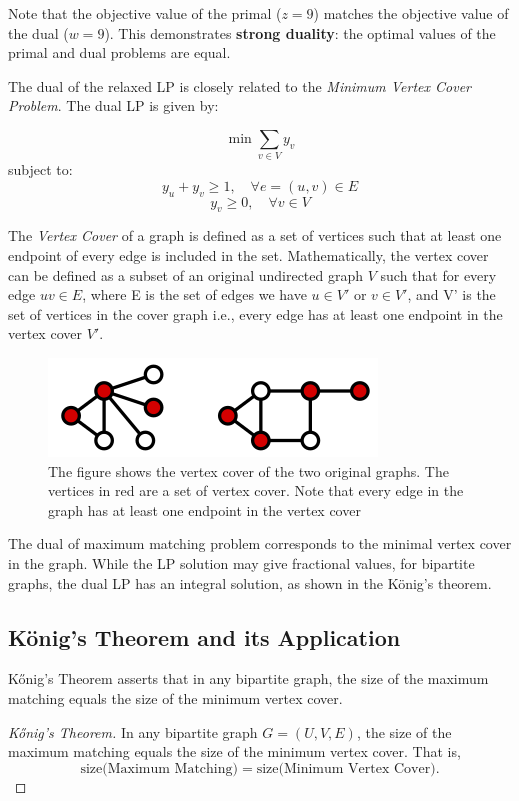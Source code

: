Note that the objective value of the primal (\(z = 9\)) matches the objective value of the dual (\(w = 9\)). This demonstrates \textbf{strong duality}: the optimal values of the primal and dual problems are equal.

The dual of the relaxed LP is closely related to the \textit{Minimum Vertex Cover Problem}. The dual LP is given by:

\begin{equation}
    \min \sum_{v \in V} y_v
\end{equation}
subject to:
\begin{equation}
    y_u + y_v \geq 1, \quad \forall e = (u, v) \in E
\end{equation}
\begin{equation}
    y_v \geq 0, \quad \forall v \in V
\end{equation}


The \emph{Vertex Cover} of a graph is defined as a set of vertices such that at least one endpoint of every edge is included in the set. Mathematically, the vertex cover can be defined as a subset of an original undirected graph \( V \) such that for every edge \( uv \in E \), where E is the set of edges we have \( u \in V' \) or \( v \in V' \), and V' is the set of vertices in the cover graph i.e., every edge has at least one endpoint in the vertex cover \( V' \).
\begin{figure}
    \centering
    \includegraphics[width=0.5\linewidth]{images/Vertex-cover.svg.png}
    \caption{The figure shows the vertex cover of the two original graphs. The vertices in red are a set of vertex cover. Note that every edge in the graph has at least one endpoint in the vertex cover}
    \label{fig:enter-label}
\end{figure}
The dual of maximum matching problem corresponds to the minimal vertex cover in the graph. \cite{yiu2023research} While the LP solution may give fractional values, for bipartite graphs, the dual LP has an integral solution, as shown in the König's theorem.

\subsection{König's Theorem and its Application}
Kőnig’s Theorem \cite{Konig1916} asserts that in any bipartite graph, the size of the maximum matching equals the size of the minimum vertex cover. 

\begin{proof}[Kőnig's Theorem]
    In any bipartite graph \( G = (U, V, E) \), the size of the maximum matching equals the size of the minimum vertex cover. That is,
    \[
    \text{size(Maximum Matching)} = \text{size(Minimum Vertex Cover)}.
    \]
\end{proof}

